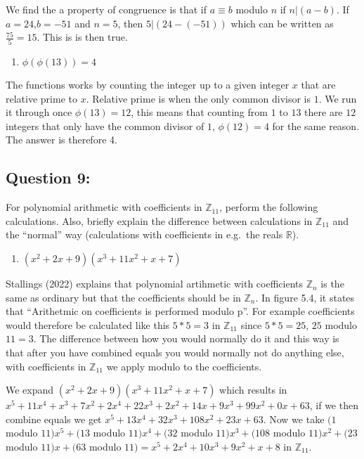\documentclass[11pt]{article}
\providecommand{\tightlist}{%
      \setlength{\itemsep}{0pt}\setlength{\parskip}{0pt}}
\begin{document}
    We find the a property of congruence is that if \(a \equiv b\) modulo
\(n\) if \(n|(a - b)\). If \(a = 24\),\(b = -51\) and \(n = 5\), then
\(5|(24-(-51))\) which can be written as \(\frac{75}{5}=15\). This is is
then true.

    \begin{enumerate}
\def\labelenumi{\alph{enumi})}
\setcounter{enumi}{5}
\tightlist
\item
  \(\phi(\phi(13))=4\)
\end{enumerate}

    The functions works by counting the integer up to a given integer \(x\)
that are relative prime to \(x\). Relative prime is when the only common
divisor is \(1\). We run it through once \(\phi(13) = 12\), this means
that counting from \(1\) to \(13\) there are \(12\) integers that only
have the common divisor of \(1\), \(\phi(12) = 4\) for the same reason.
The answer is therefore 4.

    \hypertarget{question-9}{%
\subsection{Question 9:}\label{question-9}}

For polynomial arithmetic with coefficients in \(\mathbb Z_{11}\),
perform the following calculations. Also, briefly explain the difference
between calculations in \(\mathbb Z_{11}\) and the ``normal'' way
(calculations with coefficients in e.g.~the reals \(\mathbb R\)).

\begin{enumerate}
\def\labelenumi{\alph{enumi})}
\tightlist
\item
  \((x^2 + 2x + 9)(x^3 + 11x^2 + x + 7)\)
\end{enumerate}

    Stallings (2022) explains that polynomial artihmetic with coefficients
\(\mathbb Z_{n}\) is the same as ordinary but that the coefficients
should be in \(\mathbb Z_{n}\). In figure 5.4, it states that
``Arithetmic on coefficients is performed modulo p''. For example
coefficients would therefore be calculated like this \(5 * 5 = 3\) in
\(\mathbb Z_{11}\) since \(5 * 5 = 25\), \(25\) modulo \(11 = 3\). The
difference between how you would normally do it and this way is that
after you have combined equals you would normally not do anything else,
with coefficients in \(\mathbb Z_{11}\) we apply modulo to the
coefficients.

We expand \((x^2 + 2x + 9)(x^3 + 11x^2 + x + 7)\) which results in
\(x^{5}+11x^{4}+x^{3}+7x^{2}+2x^{4}+22x^{3}+2x^{2}+14x+9x^{3}+99x^{2}+0x+63\),
if we then combine equals we get
\(x^{5}+13x^{4}+32x^{3}+108x^{2}+23x+63\). Now we take \((1\) modulo
\(11)x^{5}+(13\) modulo \(11)x^{4}+(32\) modulo \(11)x^{3}+(108\) modulo
\(11)x^{2}+(23\) modulo \(11)x+(63\) modulo
\(11) = x^{5}+2x^{4}+10x^{3}+9x^{2}+x+8\) in \(\mathbb Z_{11}\).
\end{document}
